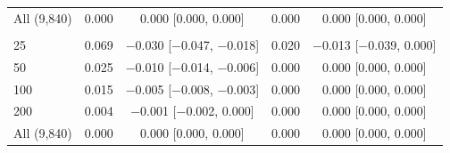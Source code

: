 \begin{tabular}{lcccc}
All (9{,}840) & 0.000 & 0.000 [0.000, 0.000] & 0.000 & 0.000 [0.000, 0.000] \\
\addlinespace
\multicolumn{5}{@{}l}{\textit{Heart, XGBoost}} \\
25 & 0.069 & $-$0.030 [$-$0.047, $-$0.018] & 0.020 & $-$0.013 [$-$0.039, 0.000] \\
50 & 0.025 & $-$0.010 [$-$0.014, $-$0.006] & 0.000 & 0.000 [0.000, 0.000] \\
100 & 0.015 & $-$0.005 [$-$0.008, $-$0.003] & 0.000 & 0.000 [0.000, 0.000] \\
200 & 0.004 & $-$0.001 [$-$0.002, 0.000] & 0.000 & 0.000 [0.000, 0.000] \\
All (9{,}840) & 0.000 & 0.000 [0.000, 0.000] & 0.000 & 0.000 [0.000, 0.000] \\
\bottomrule
\end{tabular}
